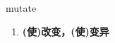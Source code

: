 
\begin{frame}
{\huge mutate}
\begin{center}
\begin{enumerate}\Large
  \item \textbf{(使)改变，(使)变异}
\end{enumerate}
\end{center}
\end{frame}
